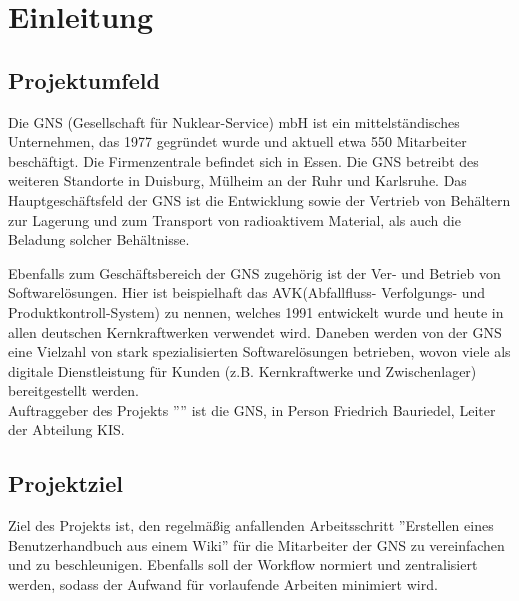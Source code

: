 \documentclass[12pt, xcolor=dvipsnames]{scrartcl}
\begin{document}

\clearpage

\tableofcontents
\clearpage

\listoffigures
\clearpage

\listoftables
\clearpage

\printnomenclature		
\clearpage



\section{Einleitung}

\subsection{Projektumfeld}
\label{sec:projektumfeld}

Die GNS (Gesellschaft für Nuklear-Service) mbH ist ein mittelständisches Unternehmen, das 1977 gegründet wurde und aktuell etwa 550 Mitarbeiter beschäftigt. Die Firmenzentrale befindet sich in Essen. Die GNS betreibt des weiteren Standorte in Duisburg, Mülheim an der Ruhr und Karlsruhe. Das Hauptgeschäftsfeld der GNS ist die Entwicklung sowie der Vertrieb von Behältern zur Lagerung und zum Transport von radioaktivem Material, als auch die Beladung solcher Behältnisse.


Ebenfalls zum Geschäftsbereich der GNS zugehörig ist der Ver- und Betrieb von Softwarelösungen. Hier ist beispielhaft das AVK(Abfallfluss- Verfolgungs- und Produktkontroll-System) zu nennen, welches 1991 entwickelt wurde und heute in allen deutschen Kernkraftwerken verwendet wird.  Daneben werden von der GNS eine Vielzahl von stark spezialisierten Softwarelösungen betrieben, wovon viele als digitale Dienstleistung für Kunden (z.B. Kernkraftwerke und Zwischenlager) bereitgestellt werden. \\

Auftraggeber des Projekts ''\Projekt'' ist die GNS, in Person Friedrich Bauriedel, Leiter der Abteilung KIS.



\subsection{Projektziel}

Ziel des Projekts ist, den regelmäßig anfallenden Arbeitsschritt ''Erstellen eines Benutzerhandbuch aus einem Wiki'' für die Mitarbeiter der GNS zu vereinfachen und zu beschleunigen. Ebenfalls soll der Workflow normiert und zentralisiert werden, sodass der Aufwand für vorlaufende Arbeiten minimiert wird.
\end{document}
